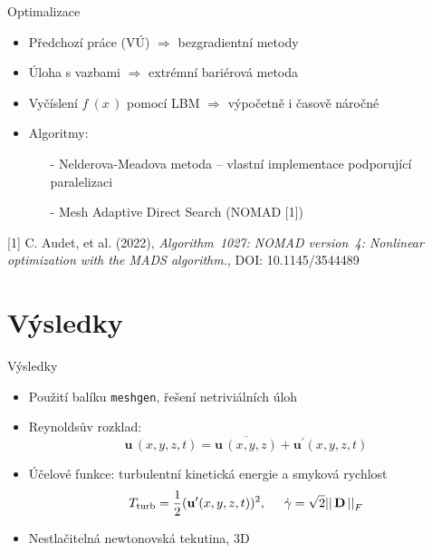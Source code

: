 \documentclass[aspectratio=169,xcolor=dvipsnames]{beamer}
\newcommand{\vect}[1]{\mathbf{#1}}
\begin{document}
\begin{frame}{Optimalizace}
	\begin{itemize}
		\setlength\itemsep{1.8em}
		\item Předchozí práce (VÚ) $\Rightarrow$ bezgradientní metody
		\item Úloha s vazbami $\Rightarrow$ extrémní bariérová metoda
		\item Vyčíslení $ f \ (x \, ) $ pomocí LBM $\Rightarrow$ \alert{výpočetně i časově náročné}
		\item Algoritmy:
			 \begin{itemize}
				\item[-] Nelderova-Meadova metoda -- vlastní implementace podporující paralelizaci
				\item[-] Mesh Adaptive Direct Search (NOMAD [1])
			 \end{itemize}
	\end{itemize}
\vspace{5.5mm}
\tiny{[1] C. Audet, et al. (2022)}, \textit{Algorithm~1027: NOMAD version~4: Nonlinear optimization with the MADS algorithm.}, DOI: 10.1145/3544489\\
\end{frame}



\section{Výsledky}
\begin{frame}{Výsledky}
	\begin{itemize}
		\setlength\itemsep{1.4em}
		\item Použití balíku \texttt{meshgen}, řešení netriviálních úloh
		\item Reynoldsův rozklad:
				$$ \vect{u} \,(x, y, z, t) = \overline{\vect{u} \,(x, y, z)} + \vect{u}^\prime(x, y, z, t) $$
		\item Účelové funkce: turbulentní kinetická energie a smyková rychlost
				$$ T_{\mathrm{turb}} = \frac{1}{2} (\vect{u}^\prime(x, y, z, t) )^2, \hspace{5mm} \dot{\gamma} = \sqrt{2} || \, \mathbf{D} \, ||^{}_{F}$$
		\item Nestlačitelná newtonovská tekutina, 3D
	\end{itemize}
\end{frame}
\end{document}
